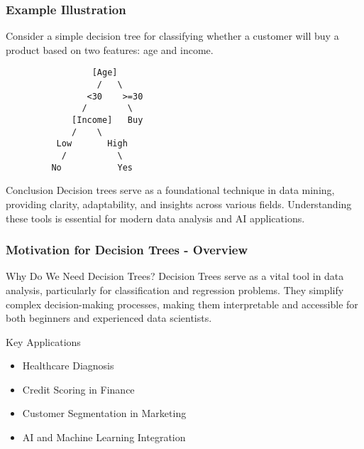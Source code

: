 \documentclass[aspectratio=169]{beamer}
\begin{document}
\begin{frame}[fragile]
    \frametitle{Example Illustration}
    Consider a simple decision tree for classifying whether a customer will buy a product based on two features: age and income.
    
    \begin{center}
        \begin{lstlisting}
                 [Age]
                  /   \
                <30    >=30
               /        \
             [Income]   Buy
             /    \
          Low       High
           /          \
         No           Yes
        \end{lstlisting}
    \end{center}

    \begin{block}{Conclusion}
        Decision trees serve as a foundational technique in data mining, providing clarity, adaptability, and insights across various fields. Understanding these tools is essential for modern data analysis and AI applications.
    \end{block}
\end{frame}

\begin{frame}[fragile]
    \frametitle{Motivation for Decision Trees - Overview}
    \begin{block}{Why Do We Need Decision Trees?}
        Decision Trees serve as a vital tool in data analysis, particularly for classification and regression problems. They simplify complex decision-making processes, making them interpretable and accessible for both beginners and experienced data scientists.
    \end{block}
    
    \begin{block}{Key Applications}
        \begin{itemize}
            \item Healthcare Diagnosis
            \item Credit Scoring in Finance
            \item Customer Segmentation in Marketing
            \item AI and Machine Learning Integration
        \end{itemize}
    \end{block}
\end{frame}
\end{document}
